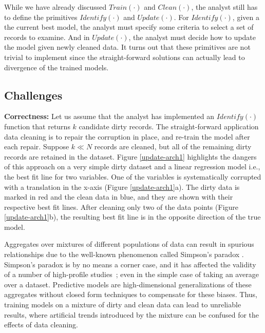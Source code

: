 \vspace{0.5em}

While we have already discussed $Train(\cdot)$ and $Clean(\cdot)$, the analyst still has to define the primitives $Identify(\cdot)$ and $Update(\cdot)$.
For $Identify(\cdot)$, given a the current best model, the analyst must specify some criteria to select a set of records to examine.
And in $Update(\cdot)$, the analyst must decide how to update the model given newly cleaned data.
It turns out that these primitives are not trivial to implement since the straight-forward solutions can actually lead to divergence of the trained models.

\subsection{Challenges}\label{correctness} 
\vspace{0.5em} 
\textbf{Correctness: } Let us assume that the analyst has implemented an $Identify(\cdot)$ function that returns $k$ candidate dirty records.
The straight-forward application data cleaning is to repair the corruption in place, and re-train the model after each repair.
Suppose $k \ll N$ records are cleaned, but all of the remaining dirty records are retained in the dataset.
Figure \ref{update-arch1} highlights the dangers of this approach on a very simple dirty dataset and a linear regression model i.e., the best fit line for two variables. 
One of the variables is systematically corrupted with a translation in the x-axis (Figure \ref{update-arch1}a).
The dirty data is marked in red and the clean data in blue, and they are shown with their respective best fit lines.
After cleaning only two of the data points (Figure \ref{update-arch1}b), the resulting best fit line is in the opposite direction of the true model.

Aggregates over mixtures of different populations of data can result in spurious relationships due to the well-known phenomenon called Simpson's paradox \cite{simpson1951interpretation}.
Simpson's paradox is by no means a corner case, and it has affected the validity of a number of high-profile studies~\cite{simpsonsparadox}; even in the simple case of taking an average over a dataset.
Predictive models are high-dimensional generalizations of these aggregates without closed form techniques to compensate for these biases.
Thus, training models on a mixture of dirty and clean data can lead to unreliable results, where artificial trends introduced by the mixture can be confused for the effects of data cleaning.

